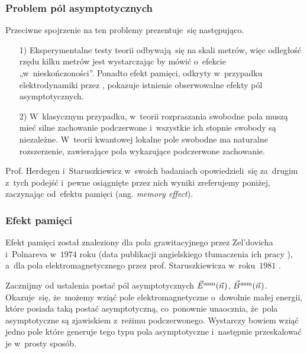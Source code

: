 \documentclass[10pt,t]{beamer}
\begin{document}
\begin{frame}
  \frametitle{Problem pól asymptotycznych}


  Przeciwne spojrzenie na ten problemy prezentuje~się następująco.

  \begin{itemize}

  \item[1)] Eksperymentalne testy teorii odbywają~się na skali metrów,
    więc odległość rzędu kilku metrów jest wystarczając by mówić o~efekcie
    „w~nieskończoności”. Ponadto efekt pamięci, odkryty w~przypadku
    elektrodynamiki przez
    , pokazuje
    istnienie obserwowalne efekty pól asymptotycznych.

  \item[2)] W~klasycznym przypadku, w~teorii rozpraszania swobodne pola
    muszą mieć silne zachowanie podczerwone i~wszystkie ich stopnie swobody
    są niezależne. W~teorii kwantowej lokalne pole swobodne ma naturalne
    rozszerzenie, zawierające pola wykazujące podczerwone zachowanie.

  \end{itemize}

  Prof. Herdegen i~Staruszkiewicz w~swoich badaniach opowiedzieli~się
  za~drugim z~tych podejść i~pewne osiągnięte przez nich wyniki zreferujemy
  poniżej, zaczynając od~efektu pamięci (ang. \textit{memory effect}).

  \end{frame}





\begin{frame}
  \frametitle{Efekt pamięci}


  Efekt pamięci został znaleziony dla pola grawitacyjnego przez
  Zel'dovicha i~Polnareva w~$1974$ roku (data publikacji angielskiego
  tłumaczenia ich pracy
  \parencite{Zeldovich-Polnarev-Radiation-of-gravitational-ETC-Pub-1974}),
  a~dla pola elektromagnetycznego przez prof. Staruszkiewicza w~roku~$1981$
  \parencite{Staruszkiewicz-Gauge-invariant-surface-contribution-ETC-Pub-1981}.

  Zacznijmy od ustalenia postać pól asymptotycznych $\vec{E}^{ \hspace{0.05em} \text{asm} }( \vec{n} \hspace{0.05em} )$,
  $\vec{B}^{ \hspace{0.05em} \text{asm} }( \vec{n} \hspace{0.05em} )$. Okazuje~się, że~możemy wziąć pole elektromagnetyczne
  o~dowolnie małej energii, które posiada taką postać asymptotyczną,
  co~ponownie unaocznia, że~pola asymptotyczne są zjawiskiem z~reżimu
  podczerwonego. Wystarczy bowiem wziąć jedno pole które generuje
  tego typu pola asymptotyczne i~następnie przeskalować je w~prosty sposób.

\end{frame}
\end{document}
